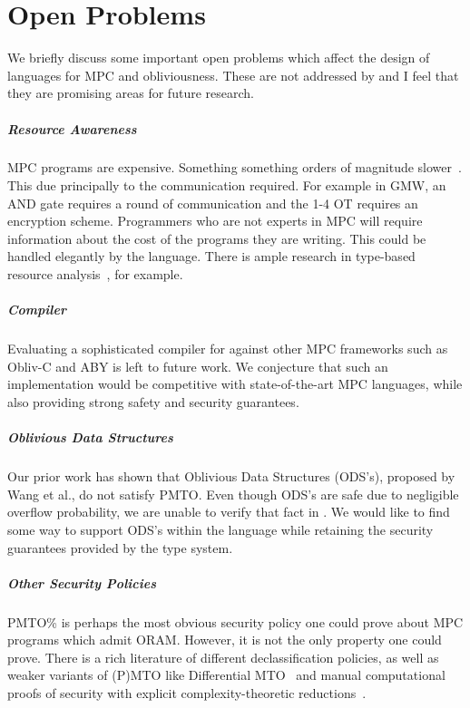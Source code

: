 \chapter{Open Problems}
We briefly discuss some important open problems which affect the design of languages for
MPC and obliviousness. These are not addressed by \lang and I feel that they are promising
areas for future research.

\paragraph{Resource Awareness}
MPC programs are expensive. Something something orders of magnitude slower~\cite{}. This due principally to the communication
required. For example in GMW, an AND gate requires a round of communication and the 1-4 OT requires an encryption scheme.
Programmers who are not experts in MPC will require information about the cost of the programs they are writing. This could be
handled elegantly by the language. There is ample research in type-based resource analysis~\cite{}, for example. 

\paragraph{\lang Compiler}
Evaluating a sophisticated compiler for \lang against other MPC frameworks such as Obliv-C and ABY is left to future work. We conjecture
that such an implementation would be competitive with state-of-the-art MPC languages, while also providing strong safety and security
guarantees.

\paragraph{Oblivious Data Structures}
Our prior work has shown that Oblivious Data Structures (ODS's), proposed by Wang et al., do not satisfy PMTO.
Even though ODS's are safe due to negligible overflow probability, we are unable to verify that fact in \lang. We would like to find some
way to support ODS's within the language while retaining the security guarantees provided by the type system.

\paragraph{Other Security Policies}
PMTO\% is perhaps the most obvious security policy one could prove about MPC programs which admit ORAM. However, it is not the only property
one could prove. There is a rich literature of different declassification policies, as well as weaker variants of (P)MTO like Differential
MTO~\cite{} and manual computational proofs of security with explicit complexity-theoretic reductions~\cite{easycrypt}.

